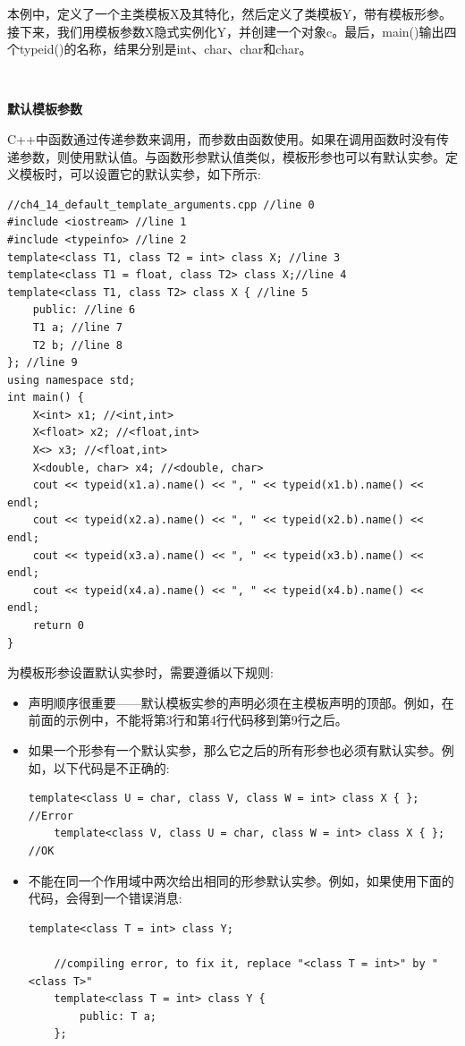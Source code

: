 本例中，定义了一个主类模板X及其特化，然后定义了类模板Y，带有模板形参。接下来，我们用模板参数X隐式实例化Y，并创建一个对象c。最后，main()输出四个typeid()的名称，结果分别是int、char、char和char。 \par

\noindent\textbf{}\ \par
\textbf{默认模板参数} \ \par
C++中函数通过传递参数来调用，而参数由函数使用。如果在调用函数时没有传递参数，则使用默认值。与函数形参默认值类似，模板形参也可以有默认实参。定义模板时，可以设置它的默认实参，如下所示: \par

\begin{lstlisting}[caption={}]
//ch4_14_default_template_arguments.cpp //line 0
#include <iostream> //line 1
#include <typeinfo> //line 2
template<class T1, class T2 = int> class X; //line 3
template<class T1 = float, class T2> class X;//line 4
template<class T1, class T2> class X { //line 5
	public: //line 6
	T1 a; //line 7
	T2 b; //line 8
}; //line 9
using namespace std;
int main() {
	X<int> x1; //<int,int>
	X<float> x2; //<float,int>
	X<> x3; //<float,int>
	X<double, char> x4; //<double, char>
	cout << typeid(x1.a).name() << ", " << typeid(x1.b).name() << endl;
	cout << typeid(x2.a).name() << ", " << typeid(x2.b).name() << endl;
	cout << typeid(x3.a).name() << ", " << typeid(x3.b).name() << endl;
	cout << typeid(x4.a).name() << ", " << typeid(x4.b).name() << endl;
	return 0
}
\end{lstlisting}

为模板形参设置默认实参时，需要遵循以下规则: \par

\begin{itemize}
	\item 声明顺序很重要——默认模板实参的声明必须在主模板声明的顶部。例如，在前面的示例中，不能将第3行和第4行代码移到第9行之后。
	\item 如果一个形参有一个默认实参，那么它之后的所有形参也必须有默认实参。例如，以下代码是不正确的:
	\begin{lstlisting}[caption={}]
	template<class U = char, class V, class W = int> class X { }; //Error
	template<class V, class U = char, class W = int> class X { }; //OK
	\end{lstlisting}
	\item 不能在同一个作用域中两次给出相同的形参默认实参。例如，如果使用下面的代码，会得到一个错误消息:
	\begin{lstlisting}[caption={}]
	template<class T = int> class Y;
	
	//compiling error, to fix it, replace "<class T = int>" by "<class T>"
	template<class T = int> class Y {
		public: T a;
	};
	\end{lstlisting}
\end{itemize}

